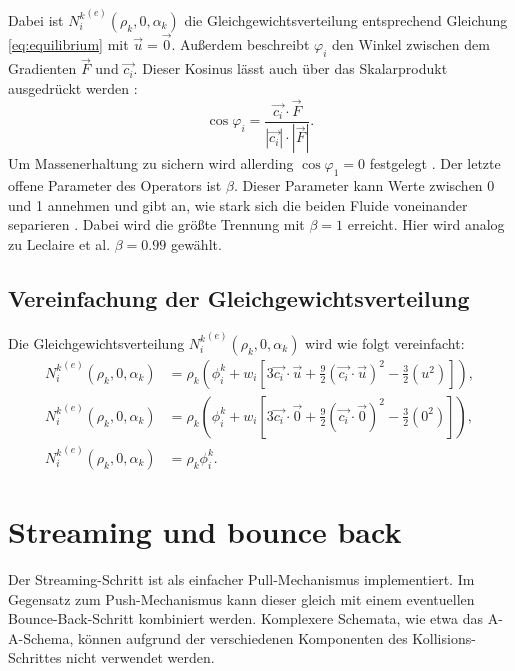 \documentclass[a4paper,10pt]{scrreprt}
\begin{document}
Dabei ist ${N_i^k}^{(e)} (\rho_k,0,\alpha_k)$ die Gleichgewichtsverteilung entsprechend Gleichung \eqref{eq:equilibrium} mit $\vec{u} = \vec{0}$. 
Außerdem beschreibt $\varphi_i$ den Winkel zwischen dem Gradienten $\vec{F}$ und $\vec{c_i}.$
Dieser Kosinus lässt auch über das Skalarprodukt ausgedrückt werden \cite{Bronstein2006}:
\begin{equation}
 \cos{\varphi_i} = \frac{\vec{c_i} \cdot \vec{F}}{|\vec{c_i}| \cdot |\vec{F}|}.
\end{equation}
Um Massenerhaltung zu sichern wird allerding $\cos{\varphi_1} = 0$ festgelegt \cite{Leclaire2011}.
Der letzte offene Parameter des Operators ist $\beta$. Dieser Parameter kann Werte zwischen 0 und 1 annehmen und gibt an, wie stark sich die beiden Fluide voneinander separieren \cite{Latva-Kokko2005}.
Dabei wird die größte Trennung mit $\beta = 1$ erreicht. 
Hier wird analog zu Leclaire et al. $\beta = \num{0.99}$ gewählt. 
\subsection{Vereinfachung der Gleichgewichtsverteilung}
Die Gleichgewichtsverteilung ${N_i^k}^{(e)} (\rho_k,0,\alpha_k)$ wird wie folgt vereinfacht:
\begin{align}
 {N_i^k}^{(e)} (\rho_k,0,\alpha_k) &= \rho_k \left( \phi_i^k + w_i \left[3 \vec{c_i} \cdot \vec{u} + \frac{9}{2} (\vec{c_i} \cdot \vec{u})^2 - \frac{3}{2} (u^2) \right]  \right), \\
 {N_i^k}^{(e)} (\rho_k,0,\alpha_k) &= \rho_k \left( \phi_i^k + w_i \left[3 \vec{c_i} \cdot \vec{0} + \frac{9}{2} (\vec{c_i} \cdot \vec{0})^2 - \frac{3}{2} (0^2) \right]  \right), \\
{N_i^k}^{(e)} (\rho_k,0,\alpha_k) &= \rho_k \phi_i^k.
\end{align}


\section{Streaming und bounce back}

Der Streaming-Schritt ist als einfacher Pull-Mechanismus implementiert. Im Gegensatz zum Push-Mechanismus kann dieser gleich mit einem eventuellen Bounce-Back-Schritt kombiniert werden. 
Komplexere Schemata, wie etwa das A-A-Schema, können aufgrund der verschiedenen Komponenten des Kollisions-Schrittes nicht verwendet werden.
\end{document}
